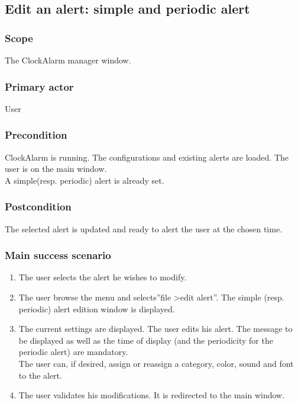 \subsection{Edit an alert: simple and periodic alert}

\subsubsection{Scope}
The ClockAlarm manager window.
\subsubsection{Primary actor}
User
\subsubsection{Precondition}
ClockAlarm is running. The configurations and existing alerts are loaded. The user is on the main window.
\\A simple(resp. periodic) alert is already set.
\subsubsection{Postcondition}
The selected alert is updated and ready to alert the user at the chosen time.
\subsubsection{Main success scenario}
\begin{enumerate}
	\item The user selects the alert he wishes to modify.
	\item \label{itm:edit} The user browse the menu and selects''file \textgreater edit alert''. The simple (resp. periodic) alert edition window is displayed. 
	\item \label{itm:enter} The current settings are displayed. The user edits his alert. The message to be displayed as well as the time of display (and the periodicity for the periodic alert) are mandatory. \\The user can, if desired, assign or reassign a category, color, sound and font to the alert.
	\item \label{itm:validate} The user validates his modifications. It is redirected to the main window.
\end{enumerate}
